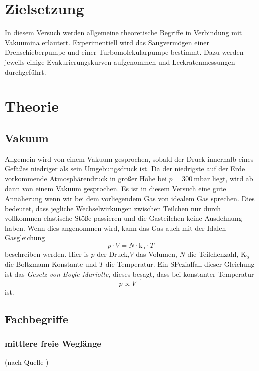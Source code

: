 \section{Zielsetzung}

	In diesem Versuch werden allgemeine theoretische Begriffe in Verbindung mit Vakuumina erläutert.
	Experimentiell wird das Saugvermögen einer Drehschieberpumpe und einer Turbomolekularpumpe bestimmt.
	Dazu werden jeweils einige Evakurierungskurven aufgenommen und Leckratenmessungen durchgeführt.

\section{Theorie}
	
	\subsection{Vakuum}
		
		Allgemein wird von einem Vakuum gesprochen, sobald der Druck innerhalb eines Gefäßes niedriger als sein Umgebungsdruck ist.
		Da der niedrigste auf der Erde vorkommende Atmosphärendruck in großer Höhe bei $p = \SI{300}{\milli\bar}$ liegt, wird ab dann von einem Vakuum gesprochen.
		Es ist in diesem Versuch eine gute Annäherung wenn wir bei dem vorliegendem Gas von idealem Gas sprechen. 
		Dies bedeutet, dass jegliche Wechselwirkungen zwischen Teilchen nur durch vollkommen elastische Stöße passieren und die Gasteilchen keine Ausdehnung haben.
		Wenn dies angenommen wird, kann das Gas auch mit der Idalen Gasgleichung
		\begin{equation}
			p \cdot V = N \cdot \text{k}_\text{b} \cdot T
		\end{equation}
		beschreiben werden.
		Hier is $p$ der Druck,$V$ das Volumen, $N$ die Teilchenzahl, $\text{K}_\text{b}$ die Boltzmann Konstante und $T$ die Temperatur. 
		Ein SPezialfall dieser Gleichung ist das \textit{Gesetz von Boyle-Mariotte}, dieses besagt, dass bei konstanter Temperatur
		\begin{equation}
			p \propto V^{-1}
		\end{equation}
		ist.

	\subsection{Fachbegriffe}

		\subsubsection{mittlere freie Weglänge}(nach Quelle \cite{wiki:mfW})
		
